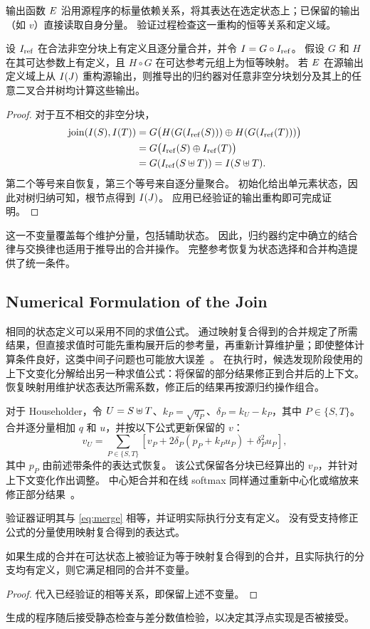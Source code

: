 输出函数 $E$ 沿用源程序的标量依赖关系，将其表达在选定状态上；已保留的输出（如 $v$）直接读取自身分量。
验证过程检查这一重构的恒等关系和定义域。

\begin{theorem}
\label{thm:correct}
设 $I_{\mathrm{ref}}$ 在合法非空分块上有定义且逐分量合并，并令 $I=G\circ I_{\mathrm{ref}}$。
假设 $G$ 和 $H$ 在其可达参数上有定义，且 $H\circ G$ 在可达参考元组上为恒等映射。
若 $E$ 在源输出定义域上从 $I(J)$ 重构源输出，则推导出的归约器对任意非空分块划分及其上的任意二叉合并树均计算这些输出。
\end{theorem}
\begin{proof}
对于互不相交的非空分块，
\[
\begin{aligned}
\operatorname{join}(I(S),I(T))
 &=G\bigl(H(G(I_{\mathrm{ref}}(S)))\oplus H(G(I_{\mathrm{ref}}(T)))\bigr)\\
 &=G\bigl(I_{\mathrm{ref}}(S)\oplus I_{\mathrm{ref}}(T)\bigr)\\
 &=G(I_{\mathrm{ref}}(S\uplus T))=I(S\uplus T).
\end{aligned}
\]
第二个等号来自恢复，第三个等号来自逐分量聚合。
初始化给出单元素状态，因此对树归纳可知，根节点得到 $I(J)$。
应用已经验证的输出重构即可完成证明。
\end{proof}

这一不变量覆盖每个维护分量，包括辅助状态。
因此，归约器约定中确立的结合律与交换律也适用于推导出的合并操作。
完整参考恢复为状态选择和合并构造提供了统一条件。

\subsection{Numerical Formulation of the Join}
\label{sec:rebase}

相同的状态定义可以采用不同的求值公式。
通过映射复合得到的合并规定了所需结果，但直接求值时可能先重构展开后的参考量，再重新计算维护量；即使整体计算条件良好，这类中间子问题也可能放大误差~\citep{higham_decomposition}。
在执行时，候选发现阶段使用的上下文变化分解给出另一种求值公式：将保留的部分结果修正到合并后的上下文。
恢复映射用维护状态表达所需系数，修正后的结果再按源归约操作组合。

对于 Householder，令 $U=S\uplus T$、$k_P=\sqrt{q_P}$、$\delta_P=k_U-k_P$，其中 $P\in\{S,T\}$。
合并逐分量相加 $q$ 和 $u$，并按以下公式更新保留的 $v$：
\[
v_U=\sum_{P\in\{S,T\}}
 \left[v_P+2\delta_P(p_P+k_Pu_P)+\delta_P^2u_P\right],
\]
其中 $p_P$ 由前述带条件的表达式恢复。
该公式保留各分块已经算出的 $v_P$，并针对上下文变化作出调整。
中心矩合并和在线 softmax 同样通过重新中心化或缩放来修正部分结果~\citep{pebay,milakov}。

验证器证明其与 \eqref{eq:merge} 相等，并证明实际执行分支有定义。
没有受支持修正公式的分量使用映射复合得到的表达式。
\begin{theorem}
\label{thm:printed}
如果生成的合并在可达状态上被验证为等于映射复合得到的合并，且实际执行的分支均有定义，则它满足相同的合并不变量。
\end{theorem}
\begin{proof}
代入已经验证的相等关系，即保留上述不变量。
\end{proof}
生成的程序随后接受静态检查与差分数值检验，以决定其浮点实现是否被接受。
